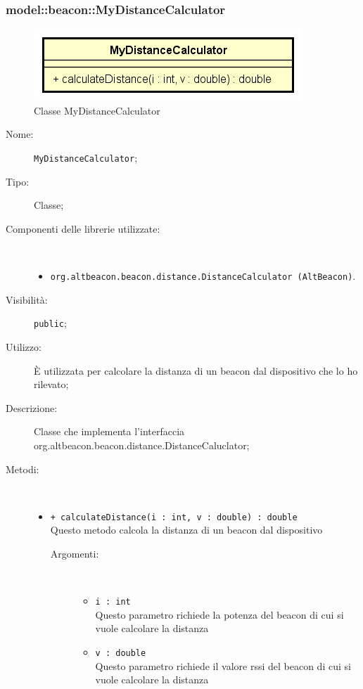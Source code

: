\documentclass[../DefinizioneDiProdotto.tex]{subfiles}
\begin{document}
\subsubsection{model::beacon::MyDistanceCalculator}

    \begin{figure}[H]
        \centering
        \includegraphics{img/MyDistanceCalculator.png}
        \caption{Classe MyDistanceCalculator}\label{fig:model::beacon::MyDistanceCalculator} 
    \end{figure}
    \begin{description}
\item[Nome:] \texttt{MyDistanceCalculator};
\item[Tipo:] Classe;
\item[Componenti delle librerie utilizzate:] \
\begin{itemize}
\item \texttt{org.altbeacon.beacon.distance.DistanceCalculator (AltBeacon)}.

\end{itemize}
\item[Visibilità:] \texttt{public};
\item[Utilizzo:] È utilizzata per calcolare la distanza di un beacon dal dispositivo che lo ho rilevato;
\item[Descrizione:] Classe che implementa l'interfaccia org.altbeacon.beacon.distance.DistanceCaluclator;
\item[Metodi:] \
\begin{itemize}
\item \texttt{+ calculateDistance(i : int, v : double) : double}\\
Questo metodo calcola la distanza di un beacon dal dispositivo
 \begin{description}
\item[Argomenti:] \
\begin{itemize}
\item \texttt{i : int}\\
Questo parametro richiede la potenza del beacon di cui si vuole calcolare la distanza\item \texttt{v : double}\\
Questo parametro richiede il valore rssi del beacon di cui si vuole calcolare la distanza\end{itemize}
\end{description}
\end{itemize}
\end{description}
\end{document}
